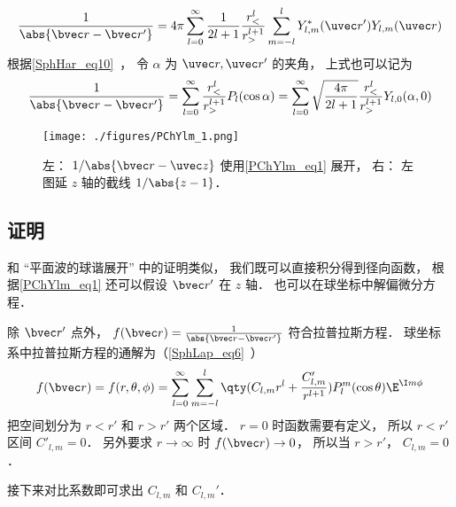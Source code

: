 
\begin{issues}
\issueDraft
\end{issues}


\begin{equation}
\frac{1}{\abs{\bvec r - \bvec r'}} = 4\pi \sum_{l=0}^{\infty} \frac{1}{2l+1} \frac{r_<^l}{r_>^{l+1}} \sum_{m = -l}^l Y_{l,m}^*(\uvec r') Y_{l,m}(\uvec r)
\end{equation}
根据\autoref{SphHar_eq10}~， 令 $\alpha$ 为 $\uvec r, \uvec r'$ 的夹角， 上式也可以记为
\begin{equation}\label{PChYlm_eq1}
\frac{1}{\abs{\bvec r - \bvec r'}} = \sum_{l=0}^{\infty} \frac{r_<^l}{r_>^{l+1}} P_l(\cos\alpha) = \sum_{l=0}^{\infty} \sqrt{\frac{4\pi}{2l+1}} \frac{r_<^l}{r_>^{l+1}} Y_{l,0}(\alpha, 0)
\end{equation}

\begin{figure}[ht]
\centering
\texttt{[image: ./figures/PChYlm\_1.png]}
\caption{左： $1/\abs{\bvec r - \uvec z}$ 使用\autoref{PChYlm_eq1} 展开， 右： 左图延 $z$ 轴的截线 $1/\abs{z - 1}$．} \label{PChYlm_fig1}
\end{figure}

\subsection{证明}
和 “平面波的球谐展开” 中的证明类似， 我们既可以直接积分得到径向函数， 根据\autoref{PChYlm_eq1} 还可以假设 $\bvec r'$ 在 $z$ 轴． 也可以在球坐标中解偏微分方程．

除 $\bvec r'$ 点外， $f(\bvec r) = \frac{1}{\abs{\bvec r - \bvec r'}}$ 符合拉普拉斯方程． 球坐标系中拉普拉斯方程的通解为（\autoref{SphLap_eq6}~）
\begin{equation}
f(\bvec r) = f(r, \theta, \phi) = \sum_{l = 0}^\infty \sum_{m = -l}^l \qty(C_{l,m} r^l + \frac{C'_{l,m}}{r^{l+1}})P_l^m(\cos\theta)\E^{\I m\phi}
\end{equation}
把空间划分为 $r < r'$ 和 $r > r'$ 两个区域． $r = 0$ 时函数需要有定义， 所以 $r < r'$ 区间 $C'_{l,m} = 0$． 另外要求 $r \to \infty$ 时 $f(\bvec r) \to 0$， 所以当 $r > r'$， $C_{l,m} = 0$．

接下来对比系数即可求出 $C_{l,m}$ 和 $C_{l,m}'$．
